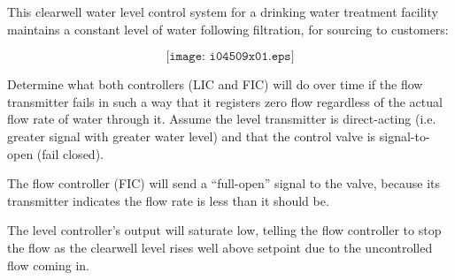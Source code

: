 

This clearwell water level control system for a drinking water treatment facility maintains a constant level of water following filtration, for sourcing to customers:

$$\texttt{[image: i04509x01.eps]}$$

Determine what both controllers (LIC and FIC) will do over time if the flow transmitter fails in such a way that it registers zero flow regardless of the actual flow rate of water through it.  Assume the level transmitter is direct-acting (i.e. greater signal with greater water level) and that the control valve is signal-to-open (fail closed).







The flow controller (FIC) will send a ``full-open'' signal to the valve, because its transmitter indicates the flow rate is less than it should be. 

\vskip 10pt

The level controller's output will saturate low, telling the flow controller to stop the flow as the clearwell level rises well above setpoint due to the uncontrolled flow coming in. 











